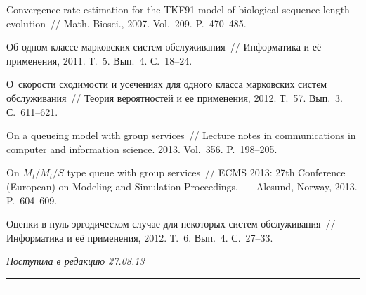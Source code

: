 \begin{multicols}{2}
{{\begin{thebibliography}{99}
  Convergence rate estimation for the TKF91
model of biological sequence length evolution~//
Math. Biosci., 2007. Vol.~209. P.~470--485.

Об одном классе марковских систем обслуживания~//  Информатика и её применения, 2011.
Т.~5. Вып.~4. С.~18--24.


О~ско\-рости сходимости и усечениях для одного класса марковских сис\-тем обслуживания~//
Теория вероятностей и ее применения, 2012. Т.~57. Вып.~3. С.~611--621.

On a queueing model with group services~// Lecture notes in communications
in computer and information science. 2013. Vol.~356. P.~198--205.

 
On $M_t/M_t/S$ type queue with group services~//  ECMS 2013:
27th  Conference (European) on Modeling and Simulation Proceedings.~---
Alesund, Norway, 2013. P.~604--609.

 
Оценки в нуль-эр\-го\-ди\-че\-ском случае для некоторых сис\-тем обслуживания~//
Информатика и её применения, 2012. Т.~6. Вып.~4. С.~27--33.

\end{thebibliography}
} }

\end{multicols}

\hfill{\small\textit{Поступила в редакцию 27.08.13}}


\vspace*{12pt}

\hrule

\vspace*{2pt}

\hrule


\def\tit{GENERAL BOUNDS FOR~NONSTATIONARY CONTINUOUS-TIME MARKOV CHAINS}

\def\titkol{General bounds for~nonstationary continuous-time Markov chains}

\def\aut{A.\,I.~Zeifman$^{1,2}$, V.\,Yu.~Korolev$^{2,3}$, A.\,V.~Korotysheva$^{1}$,
and~S.\,Ya.~Shorgin$^2$}
\def\autkol{A.\,I.~Zeifman, V.\,Yu.~Korolev, A.\,V.~Korotysheva,
and~S.\,Ya.~Shorgin}


